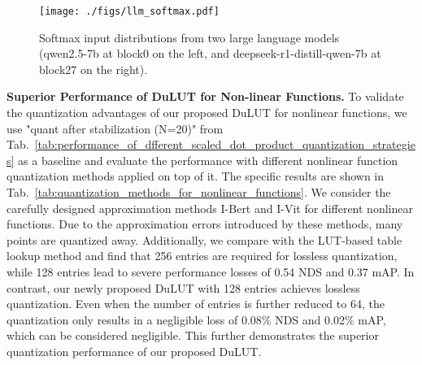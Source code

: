 \begin{table}[htb] %
    \centering
    \vspace{-2mm}
    \caption{Quant after ns in LLMs}
    \label{tab:comparison_qwen_deepseek}
    \vspace{-3mm}
\end{table}


\begin{figure}[htb]
\centering
	\texttt{[image: ./figs/llm\_softmax.pdf]}
    \vspace{-6mm}
	\caption{Softmax input distributions from two large language models (qwen2.5-7b at block0 on the left, and deepseek-r1-distill-qwen-7b at block27 on the right).}
	\label{fig:llm_softmax}
    \vspace{-0.5cm}
\end{figure}




\vspace{0.3cm}
\textbf{Superior Performance of DuLUT for Non-linear Functions.}\label{}
To validate the quantization advantages of our proposed DuLUT for nonlinear functions, 
we use "quant after stabilization (N=20)" from Tab.~\ref{tab:performance_of_dfferent_scaled_dot_product_quantization_strategies} as a baseline and evaluate the performance with different nonlinear function quantization methods applied on top of it. 
The specific results are shown in Tab.~\ref{tab:quantization_methods_for_nonlinear_functions}. 
We consider the carefully designed approximation methods I-Bert and I-Vit for different nonlinear functions. 
Due to the approximation errors introduced by these methods, 
many points are quantized away.
Additionally, we compare with the LUT-based table lookup method and find that 256 entries are required for lossless quantization, 
while 128 entries lead to severe performance losses of 0.54 NDS and 0.37 mAP. 
In contrast, our newly proposed DuLUT with 128 entries achieves lossless quantization. 
Even when the number of entries is further reduced to 64, 
the quantization only results in a negligible loss of 0.08\% NDS and 0.02\% mAP, 
which can be considered negligible. 
This further demonstrates the superior quantization performance of our proposed DuLUT.



